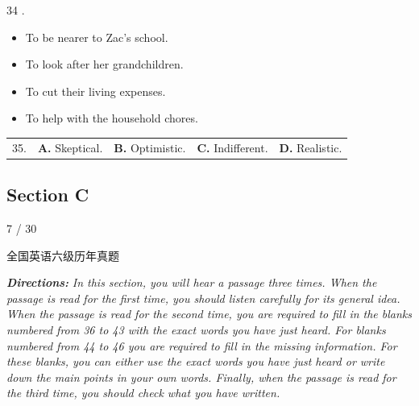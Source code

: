\documentclass[UTF8,11pt]{ctexart}
\begin{document}
34 .


\begin{itemize}[leftmargin=2em,itemsep=.2em,topsep=.4em]\item[A.] To be nearer to Zac's school.
\item[B.] To look after her grandchildren.
\item[C.] To cut their living expenses.
\item[D.] To help with the household chores.
\end{itemize}

\noindent\begin{tabularx}{\linewidth}{@{}lXXXX@{}}35. & \textbf{A.} Skeptical. & \textbf{B.} Optimistic. & \textbf{C.} Indifferent. & \textbf{D.} Realistic.\\\end{tabularx}\par

\subsection*{\textbf{Section C}}


7 / 30


全国英语六级历年真题


\textbf{\textit{Directions:}}\textit{ In this section, you will hear a passage three times. When the passage is read for the} \textit{first time, you should listen carefully for its general idea. When the passage is read for} \textit{the second time, you are required to fill in the blanks numbered from 36 to 43 with the} \textit{exact words you have just heard. For blanks numbered from 44 to 46 you are required} \textit{to fill in the missing information. For these blanks, you can either use the exact words} \textit{you have just heard or write down the main points in your own words. Finally, when} \textit{the passage is read for the third time, you should check what you have written.}
\end{document}
